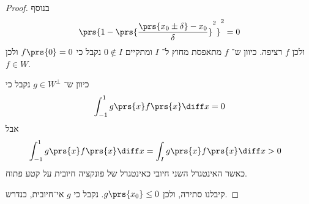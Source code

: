 \documentclass[a4paper,10pt,twoside,openany]{article}
\begin{document}
\begin{description}
\begin{proof}
בנוסף
\begin{align*}
\prs{1 - \prs{\frac{\prs{x_0 \pm \delta} - x_0}{\delta}}^2}^2 = 0
\end{align*}
ולכן
$f$
רציפה. כיוון ש־%
$f$
מתאפסת מחוץ ל־%
$I$
ומתקיים
$0 \notin I$
נקבל כי
$f\prs{0} = 0$
ולכן
$f \in W$.

כיוון ש־%
$g \in W^\perp$
נקבל כי
\begin{align*}
\int_{-1}^1 g\prs{x} f\prs{x} \diff x = 0
\end{align*}
אבל
\begin{align*}
\int_{-1}^1 g\prs{x} f\prs{x} \diff x
&=
\int_I g\prs{x} f\prs{x} \diff x > 0
\end{align*}
כאשר האינטגרל השני חיובי כאינטגרל של פונקציה חיובית על קטע פתוח.

קיבלנו סתירה, ולכן
$g\prs{x_0} \leq 0$.
נקבל כי
$g$
אי־חיובית, כנדרש.
\end{proof}

\end{description}
\end{document}
